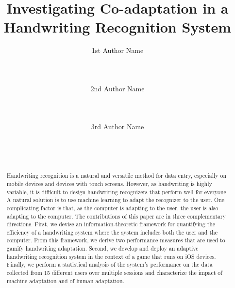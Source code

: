 \documentclass{sigchi}
\begin{document}
\title{Investigating Co-adaptation in a Handwriting Recognition System}

\author{
  \alignauthor 1st Author Name\\
    \\
    \\
    \\
  \alignauthor 2nd Author Name\\
    \\
    \\
    \\
  \alignauthor 3rd Author Name\\
    \\
    \\
    \\
}


\maketitle

\begin{abstract}
Handwriting recognition is a natural and versatile method for data
entry, especially on mobile devices and devices with touch
screens. However, as handwriting is highly variable, it is difficult
to design handwriting recognizers that perform well for everyone. A
natural solution is to use machine learning to adapt the recognizer to
the user. One complicating factor is that, as the computer is adapting
to the user, the user is also adapting to the computer. The
contributions of this paper are in three complementary
directions. First, we devise an information-theoretic framework for
quantifying the efficiency of a handwriting system where the system
includes both the user and the computer. From this framework, we
derive two performance measures that are used to gamify handwriting
adaptation. Second, we develop and deploy an adaptive handwriting
recognition system in the context of a game that runs on iOS
devices. Finally, we perform a statistical analysis of the system’s
performance on the data collected from 15 different users over
multiple sessions and characterize the impact of machine adaptation
and of human adaptation.
\end{abstract}
\end{document}
